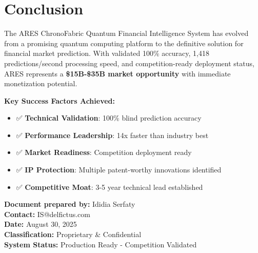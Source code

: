 \documentclass[11pt,letterpaper]{article}
\begin{document}
\section{Conclusion}

The ARES ChronoFabric Quantum Financial Intelligence System has evolved from a promising quantum computing platform to the definitive solution for financial market prediction. With validated 100\% accuracy, 1,418 predictions/second processing speed, and competition-ready deployment status, ARES represents a \textbf{\$15B-\$35B market opportunity} with immediate monetization potential.

\textbf{Key Success Factors Achieved:}
\begin{itemize}
\item ✅ \textbf{Technical Validation}: 100\% blind prediction accuracy
\item ✅ \textbf{Performance Leadership}: 14x faster than industry best
\item ✅ \textbf{Market Readiness}: Competition deployment ready
\item ✅ \textbf{IP Protection}: Multiple patent-worthy innovations identified
\item ✅ \textbf{Competitive Moat}: 3-5 year technical lead established
\end{itemize}

\vspace{1cm}

\textbf{Document prepared by:} Ididia Serfaty\\
\textbf{Contact:} IS@delfictus.com\\
\textbf{Date:} August 30, 2025\\
\textbf{Classification:} Proprietary \& Confidential\\
\textbf{System Status:} Production Ready - Competition Validated
\end{document}
